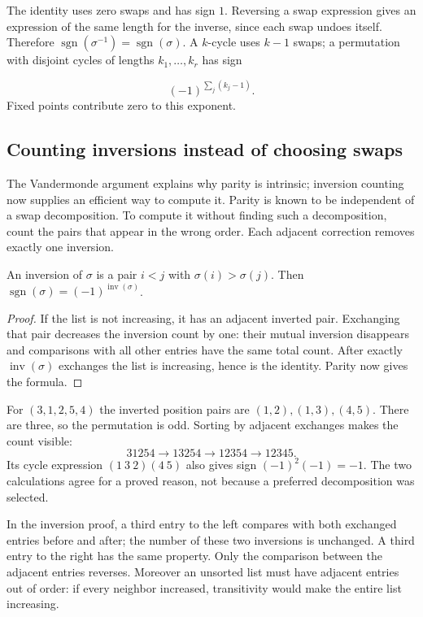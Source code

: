 The identity uses zero swaps and has sign $1$. Reversing a swap expression
gives an expression of the same length for the inverse, since each swap
undoes itself. Therefore $\operatorname{sgn}(\sigma^{-1})
=\operatorname{sgn}(\sigma)$. A $k$-cycle uses $k-1$ swaps; a
permutation with disjoint cycles of lengths $k_1,\ldots,k_r$ has sign

\[
(-1)^{\sum_j(k_j-1)}.
\]
 Fixed points contribute zero to this exponent.
\subsection{Counting inversions instead of choosing swaps}

The Vandermonde argument explains why parity is intrinsic; inversion
counting now supplies an efficient way to compute it.
Parity is known to be independent of a swap decomposition. To compute
it without finding such a decomposition, count the pairs that appear in
the wrong order. Each adjacent correction removes exactly one inversion.

\begin{proposition}
An inversion of $\sigma$ is a pair $i<j$ with $\sigma(i)>\sigma(j)$.
Then $\operatorname{sgn}(\sigma)=(-1)^{\operatorname{inv}(\sigma)}$.
\end{proposition}
\begin{proof}
If the list is not increasing, it has an adjacent inverted pair.
Exchanging that pair decreases the inversion count by one: their mutual
inversion disappears and comparisons with all other entries have the same
total count. After exactly $\operatorname{inv}(\sigma)$ exchanges the list
is increasing, hence is the identity. Parity now gives the formula.
\end{proof}
\begin{example}
For $(3,1,2,5,4)$ the inverted position pairs are $(1,2),(1,3),(4,5)$.
There are three, so the permutation is odd. Sorting by adjacent exchanges
makes the count visible:
\[
31254\longrightarrow13254\longrightarrow12354\longrightarrow12345.
\]
Its cycle expression $(1\ 3\ 2)(4\ 5)$ also gives sign
$(-1)^2(-1)=-1$. The two calculations agree for a proved reason, not
because a preferred decomposition was selected.
\end{example}
In the inversion proof, a third entry to the left compares with both
exchanged entries before and after; the number of these two inversions is
unchanged. A third entry to the right has the same property. Only the
comparison between the adjacent entries reverses. Moreover an unsorted
list must have adjacent entries out of order: if every neighbor increased,
transitivity would make the entire list increasing.
